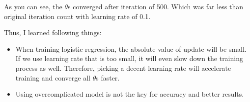 \documentclass{homework}
\begin{document}
As you can see, the $\theta$s converged after iteration of 500. Which was far less than original iteration count with learning rate of 0.1.

Thus, I learned following things:
\begin{itemize}
    \item When training logistic regression, the absolute value of update will be small. If we use learning rate that is too small, it will even slow down the training process as well. Therefore, picking a decent learning rate will accelerate training and converge all $\theta$s faster.
    \item Using overcomplicated model is not the key for accuracy and better results. 
\end{itemize}
\end{document}
